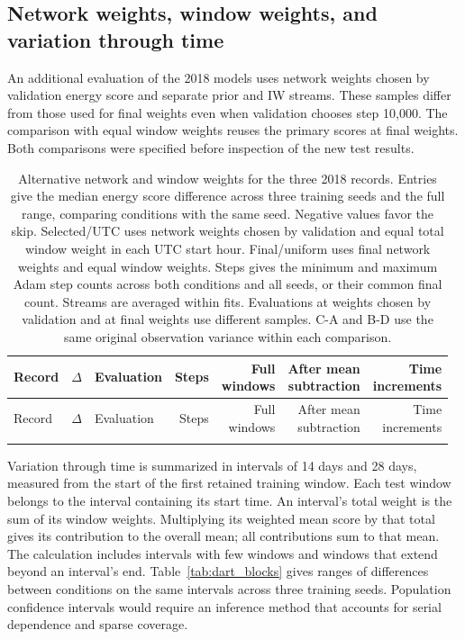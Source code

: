 \documentclass{article}
\begin{document}
\clearpage
\subsection{Network weights, window weights, and variation through time}
An additional evaluation of the 2018 models uses network weights chosen by validation energy score and separate prior and IW streams. These samples differ from those used for final weights even when validation chooses step 10,000. The comparison with equal window weights reuses the primary scores at final weights. Both comparisons were specified before inspection of the new test results.

\begingroup
\setlength{\tabcolsep}{1.3pt}
\begin{longtable}{lllrrrr}
\caption{Alternative network and window weights for the three 2018 records. Entries give the median energy score difference across three training seeds and the full range, comparing conditions with the same seed. Negative values favor the skip. Selected/UTC uses network weights chosen by validation and equal total window weight in each UTC start hour. Final/uniform uses final network weights and equal window weights. Steps gives the minimum and maximum Adam step counts across both conditions and all seeds, or their common final count. Streams are averaged within fits. Evaluations at weights chosen by validation and at final weights use different samples. C-A and B-D use the same original observation variance within each comparison.}\label{tab:dart_selected}\\
\toprule
Record & $\Delta$ & Evaluation & Steps & \shortstack{Full\\windows} & \shortstack{After mean\\subtraction} & \shortstack{Time\\increments}\\
\midrule
\endfirsthead
\toprule
Record & $\Delta$ & Evaluation & Steps & \shortstack{Full\\windows} & \shortstack{After mean\\subtraction} & \shortstack{Time\\increments}\\
\midrule
\endhead
\\
\bottomrule
\end{longtable}
\endgroup

Variation through time is summarized in intervals of 14 days and 28 days, measured from the start of the first retained training window. Each test window belongs to the interval containing its start time. An interval's total weight is the sum of its window weights. Multiplying its weighted mean score by that total gives its contribution to the overall mean; all contributions sum to that mean. The calculation includes intervals with few windows and windows that extend beyond an interval's end. Table~\ref{tab:dart_blocks} gives ranges of differences between conditions on the same intervals across three training seeds. Population confidence intervals would require an inference method that accounts for serial dependence and sparse coverage.
\end{document}
